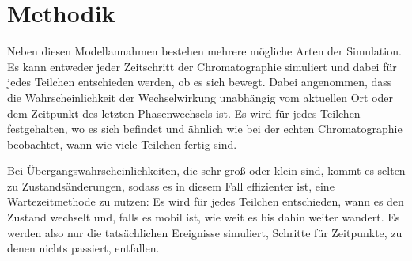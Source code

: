 \documentclass[a4paper,10pt]{article}
\begin{document}


\section{Methodik}
Neben diesen Modellannahmen bestehen mehrere mögliche Arten der Simulation. Es kann entweder jeder Zeitschritt der Chromatographie simuliert und dabei für jedes Teilchen entschieden werden, ob es sich bewegt. Dabei angenommen, dass die Wahrscheinlichkeit der Wechselwirkung unabhängig vom aktuellen Ort oder dem Zeitpunkt des letzten Phasenwechsels ist. Es wird für jedes Teilchen festgehalten, wo es sich befindet und ähnlich wie bei der echten Chromatographie beobachtet, wann wie viele Teilchen fertig sind. 

Bei Übergangswahrscheinlichkeiten, die sehr groß oder klein sind, kommt es selten zu Zustandsänderungen, sodass es in diesem Fall effizienter ist, eine Wartezeitmethode zu nutzen: Es wird für jedes Teilchen entschieden, wann es den Zustand wechselt und, falls es mobil ist, wie weit es bis dahin weiter wandert. Es werden also nur die tatsächlichen Ereignisse simuliert, Schritte für Zeitpunkte, zu denen nichts passiert, entfallen.







\listoftodos
\end{document}
